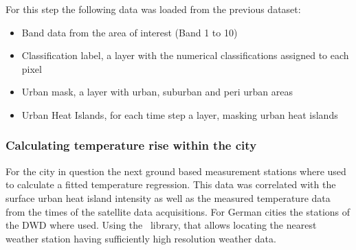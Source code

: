 \documentclass[12pt,a4paper, english]{article}
\begin{document}
    For this step the following data was loaded from the previous dataset: 
    \begin{itemize}
      \item Band data from the area of interest (Band 1 to 10)
      \item Classification label, a layer with the numerical classifications assigned to each pixel 
      \item Urban mask, a layer with urban, suburban and peri urban areas
      \item Urban Heat Islands, for each time step a layer, masking urban heat islands
    \end{itemize}

    \subsubsection{Calculating temperature rise within the city}
    For the city in question the next ground based measurement stations where used to calculate a fitted temperature regression. 
    This data %
    was correlated with the surface urban heat island intensity as well as the measured temperature data from the times of the satellite data acquisitions. 
    For German cities the stations of the \gls{DWD} where used.
    Using the~\cite{wetterdienst2024} library, that allows locating the nearest weather station having sufficiently high resolution weather data. 



\end{document}
